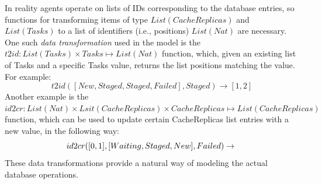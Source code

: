 \documentclass[10pt,conference]{IEEEtran}
\begin{document}
In reality agents operate on lists of IDs corresponding to the database
entries, so functions for transforming items of type \begin{math}List(CacheReplicas)\end{math}
and \begin{math}List(Tasks)\end{math}
to a list of identifiers (i.e., positions) 
\begin{math}List(Nat)\end{math} are necessary.
One such \textit{data transformation} used in the model is the 
$t2id:List(Tasks)\times Tasks\mapsto List(Nat)$ function, which,
given an existing list of Tasks and a specific Tasks value, returns the list positions
 matching the value.
For example:
\begin{displaymath}
t2id([New,Staged,Staged,Failed],Staged)\rightarrow [1,2] 
\end{displaymath}
Another example is the 
$id2cr:List(Nat)\times Lsit(CacheReplicas)\times CacheReplicas\mapsto List(CacheReplicas)$                                                                                                
function, which can be used to update certain CacheReplicas list entries with a new value, in the following way:
\begin{displaymath}
id2cr([0,1],[Waiting,Staged,New],Failed) \\
 \rightarrow \\
\end{displaymath}
\begin{displaymath}
[Failed,Failed,New]
\end{displaymath}
These data transformations provide a natural way of modeling
the actual database operations.
\end{document}
